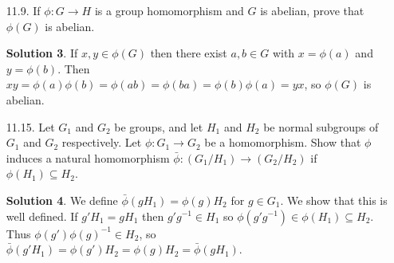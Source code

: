 \documentclass{article}
\newcommand{\RR}{\mathbb{R}}
\DeclareMathOperator{\GL}{GL}
\DeclareMathOperator{\SL}{SL}
\theoremstyle{definition}
\newtheorem*{solution}{Solution}
\begin{document}
\begin{enumerate}
\begin{enumerate}
\begin{solution}
\begin{align*}
\end{align*}
The kernel is $\SL_2(\RR)$, the subgroup of $\GL_2(\RR)$ consisting of matrices of determinant $1$.
\end{solution}
\item $\phi : \mathbb{M}_2(\RR) \to \RR$ defined by 
\[
\phi\left(\begin{psmallmatrix} a & b \\ c & d \end{psmallmatrix}\right) = b,
\]
where $\mathbb{M}_2(\RR)$ is the additive group of $2 \times 2$ matrices with entries in $\RR$.
\begin{solution}
This is a homomorphism, since
\[
\phi\left(\begin{pmatrix} a & b \\ c & d \end{pmatrix} + \begin{pmatrix} a' & b' \\ c' & d' \end{pmatrix}\right) = b + b' = \phi\left(\begin{pmatrix} a & b \\ c & d \end{pmatrix}\right) + \phi\left(\begin{pmatrix} a' & b' \\ c' & d' \end{pmatrix}\right).
\]
The kernel is the group (under addition) of lower triangular matrices:
\[
\left\{\begin{pmatrix} a & 0 \\ b & c \end{pmatrix} : a, b, c \in \RR\right\}.
\]
\end{solution}
\end{enumerate}
\item[11.9.] If $\phi : G \to H$ is a group homomorphism and $G$ is abelian, prove that $\phi(G)$ is abelian.
\begin{solution}
If $x, y \in \phi(G)$ then there exist $a,b \in G$ with $x = \phi(a)$ and $y = \phi(b)$.  Then $xy = \phi(a)\phi(b) = \phi(ab) = \phi(ba) = \phi(b)\phi(a) = yx$, so $\phi(G)$ is abelian.
\end{solution}
\item[11.15.] Let $G_1$ and $G_2$ be groups, and let $H_1$ and $H_2$ be normal subgroups of $G_1$ and $G_2$ respectively. Let $\phi : G_1 \to G_2$ be a homomorphism. Show that $\phi$ induces a natural homomorphism $\bar{\phi} : (G_1 / H_1) \to (G_2 / H_2)$ if $\phi(H_1) \subseteq H_2$.
\begin{solution}
We define $\bar{\phi}(gH_1) = \phi(g)H_2$ for $g \in G_1$.  We show that this is well defined. If $g'H_1 = gH_1$ then $g'g^{-1} \in H_1$ so $\phi(g'g^{-1}) \in \phi(H_1) \subseteq H_2$.  Thus $\phi(g')\phi(g)^{-1} \in H_2$, so $\bar{\phi}(g'H_1) = \phi(g')H_2 = \phi(g)H_2 = \bar{\phi}(gH_1)$.


\end{solution}
\end{enumerate}
\end{document}
